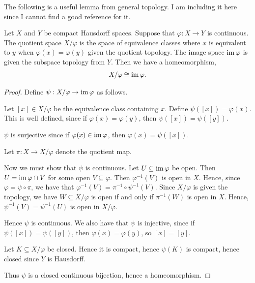 \documentclass{unswmaths}
\begin{document}
The following is a useful lemma from general topology. I am including
it here since I cannot find a good reference for it.
\begin{lemma}
\label{topIsom}
    Let $X$ and $Y$ be compact Hausdorff spaces. Suppose that $\varphi:X\rightarrow Y$
    is continuous. The quotient space $X/\varphi$ is the space
    of equivalence classes where $x$ is equivalent to $y$ when $\varphi(x) = \varphi(y)$
    given the quotient topology. The image space $\operatorname{im} \varphi$ is given the subspace
    topology from $Y$. Then we have a homeomorphism,
    \begin{equation*}
        X/\varphi \cong \operatorname{im}\varphi.
    \end{equation*}
\end{lemma}
\begin{proof}
    Define $\psi:X/\varphi\rightarrow \operatorname{im}\varphi$ as follows. 
    
    Let $[x] \in X/\varphi$ be the equivalence class containing $x$. Define
    $\psi([x]) = \varphi(x)$. This is well defined, since if $\varphi(x) = \varphi(y)$,
    then $\psi([x]) = \psi([y])$.
    
    $\psi$ is surjective since if $\varphi(x) \in \operatorname{im}\varphi$, then $\varphi(x) = \psi([x])$. 
    
    Let $\pi:X\rightarrow X/\varphi$ denote the quotient map.
    
    Now we must show that $\psi$ is continuous. Let $U \subseteq \operatorname{im}\varphi$ be open.
    Then $U = \operatorname{im}\varphi \cap V$ for some open $V \subseteq \varphi$. Then $\varphi^{-1}(V)$
    is open in $X$. Hence, since $\varphi = \psi \circ \pi$, we have that
    $\varphi^{-1}(V) = \pi^{-1}\circ\psi^{-1}(V)$. Since $X/\varphi$
    is given the topology, we have $W \subseteq X/\varphi$ is open if and only
    if $\pi^{-1}(W)$ is open in $X$. Hence, $\psi^{-1}(V) = \psi^{-1}(U)$
    is open in $X/\varphi$.
    
    Hence $\psi$ is continuous. We also have that $\psi$ is injective,
    since if $\psi([x]) = \psi([y])$, then $\varphi(x) = \varphi(y)$, so $[x] = [y]$.
    
    Let $K \subseteq X/\varphi$ be closed. Hence it is compact, hence $\psi(K)$
    is compact, hence closed since $Y$ is Hausdorff. 
    
    Thus $\psi$ is a closed continuous bijection, hence a homeomorphism.
\end{proof}
\end{document}
